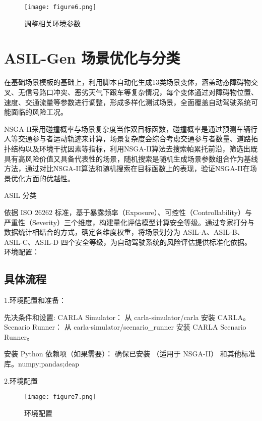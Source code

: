 \begin{figure}[htbp]
	\centering
	\texttt{[image: figure6.png]} %
	\caption{调整相关环境参数} %
	\label{fig:example} %
\end{figure}



\section{ASIL-Gen 场景优化与分类}


在基础场景模板的基础上，利用脚本自动化生成13类场景变体，涵盖动态障碍物交叉、无信号路口冲突、恶劣天气下跟车等复杂情况，每个变体通过对障碍物位置、速度、交通流量等参数进行调整，形成多样化测试场景，全面覆盖自动驾驶系统可能面临的风险工况。


NSGA-II采用碰撞概率与场景复杂度当作双目标函数，碰撞概率是通过预测车辆行人等交通参与者运动轨迹来计算，场景复杂度会综合考虑交通参与者数量、道路拓扑结构以及环境干扰因素等指标，利用NSGA-II算法去搜索帕累托前沿，筛选出既具有高风险价值又具备代表性的场景，随机搜索是随机生成场景参数组合作为基线方法，通过对比NSGA-II算法和随机搜索在目标函数上的表现，验证NSGA-II在场景优化方面的优越性\cite{national2008integrated}。

ASIL 分类

依据 ISO 26262 标准，基于暴露频率（Exposure）、可控性（Controllability）与严重性（Severity）三个维度，构建量化评估模型计算安全等级。通过专家打分与数据统计相结合的方式，确定各维度权重，将场景划分为 ASIL-A、ASIL-B、ASIL-C、ASIL-D 四个安全等级，为自动驾驶系统的风险评估提供标准化依据。
环境配置：



\subsection{具体流程}

1.环境配置和准备：

先决条件和设置:
CARLA Simulator：
从 carla-simulator/carla 安装 CARLA。
Scenario Runner：
从 carla-simulator/scenario\_runner 安装 CARLA Scenario Runner。

安装 Python 依赖项（如果需要）：
确保已安装 （适用于 NSGA-II） 和其他标准库。numpy;pandas;deap

2.环境配置


\begin{figure}[htbp]
	\centering
	\texttt{[image: figure7.png]} %
	\caption{环境配置} %
	\label{fig:example} %
\end{figure}

